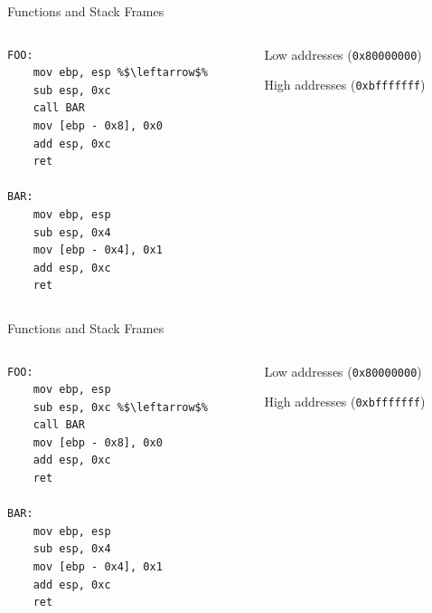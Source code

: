 \documentclass[]{beamer}
\begin{document}
\begin{frame}[fragile]{Functions and Stack Frames}
  \begin{columns}
    \begin{column}{0.45\linewidth}
      \begin{lstlisting}[language={[x86masm]Assembler}, escapechar=\%]
FOO:
    mov ebp, esp %$\leftarrow$%
    sub esp, 0xc
    call BAR
    mov [ebp - 0x8], 0x0 
    add esp, 0xc 
    ret

BAR:
    mov ebp, esp
    sub esp, 0x4
    mov [ebp - 0x4], 0x1
    add esp, 0xc
    ret
      \end{lstlisting}
    \end{column}
    \begin{column}{0.4\linewidth}
      \par
      {\scriptsize Low addresses ({\tt 0x80000000})}\\[.5em]
      {\scriptsize High addresses ({\tt 0xbfffffff})}
    \end{column}
  \end{columns}
\end{frame}

\begin{frame}[fragile]{Functions and Stack Frames}
  \begin{columns}
    \begin{column}{0.45\linewidth}
      \begin{lstlisting}[language={[x86masm]Assembler}, escapechar=\%]
FOO:
    mov ebp, esp 
    sub esp, 0xc %$\leftarrow$%
    call BAR
    mov [ebp - 0x8], 0x0 
    add esp, 0xc 
    ret

BAR:
    mov ebp, esp
    sub esp, 0x4
    mov [ebp - 0x4], 0x1
    add esp, 0xc
    ret
      \end{lstlisting}
    \end{column}
    \begin{column}{0.4\linewidth}
      \par
      {\scriptsize Low addresses ({\tt 0x80000000})}\\[.5em]
      {\scriptsize High addresses ({\tt 0xbfffffff})}
    \end{column}
  \end{columns}
\end{frame}
\end{document}
